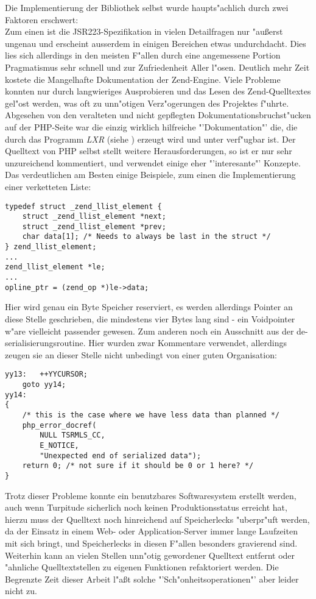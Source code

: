 Die Implementierung der Bibliothek selbst wurde haupts"achlich durch zwei Faktoren erschwert:\\
Zum einen ist die JSR223-Spezifikation in vielen Detailfragen nur "au\ss erst ungenau und erscheint ausserdem
in einigen Bereichen etwas undurchdacht. Dies lies sich allerdings in den meisten F"allen durch eine
angemessene Portion Pragmatismus sehr schnell und zur Zufriedenheit Aller l"osen. Deutlich mehr Zeit
kostete die Mangelhafte Dokumentation der Zend-Engine. Viele Probleme konnten nur durch langwieriges
Ausprobieren und das Lesen des Zend-Quelltextes gel"ost werden, was oft zu unn"otigen Verz"ogerungen 
des Projektes f"uhrte. Abgesehen von den veralteten und nicht gepflegten Dokumentationsbruchst"ucken
auf der PHP-Seite \cite{PHPHP} war die einzig wirklich hilfreiche "'Dokumentation"' die, die durch das Programm
\emph{LXR} (siehe \cite{LXRHP}) erzeugt wird und unter \cite{PHPLXR} verf"ugbar ist. Der Quelltext
von PHP selbst stellt weitere Herausforderungen, so ist er nur sehr unzureichend kommentiert, und verwendet
einige eher "'interesante"' Konzepte. Das verdeutlichen am Besten einige Beispiele, zum einen die 
Implementierung einer verketteten Liste:
\begin{lstlisting}[caption=Verkettete Liste im Zend-Code]
typedef struct _zend_llist_element {
    struct _zend_llist_element *next;
    struct _zend_llist_element *prev;
    char data[1]; /* Needs to always be last in the struct */
} zend_llist_element;
...
zend_llist_element *le;
...
opline_ptr = (zend_op *)le->data;
\end{lstlisting}
Hier wird genau ein Byte Speicher reserviert, es werden allerdings Pointer an diese Stelle geschrieben,
die mindestens vier Bytes lang sind - ein Voidpointer w"are vielleicht passender gewesen.
Zum anderen noch ein Ausschnitt aus der de-serialisierungsroutine. Hier wurden zwar Kommentare
verwendet, allerdings zeugen sie an dieser Stelle nicht unbedingt von einer guten Organisation:
\begin{lstlisting}[caption=lustiges Beispiel f"ur Zend-Code]
yy13:   ++YYCURSOR;
    goto yy14;
yy14:
{
    /* this is the case where we have less data than planned */
    php_error_docref(
        NULL TSRMLS_CC, 
        E_NOTICE, 
        "Unexpected end of serialized data");
    return 0; /* not sure if it should be 0 or 1 here? */
}
\end{lstlisting}

Trotz dieser Probleme konnte ein benutzbares Softwaresystem erstellt werden, auch wenn Turpitude sicherlich
noch keinen Produktionsstatus erreicht hat, hierzu muss der Quelltext noch hinreichend auf Speicherlecks
"uberpr"uft werden, da der Einsatz in einem Web- oder Application-Server immer lange Laufzeiten mit sich bringt,
und Speicherlecks in diesen F"allen besonders gravierend sind. Weiterhin kann an vielen Stellen unn"otig gewordener
Quelltext entfernt oder "ahnliche Quelltextstellen zu eigenen Funktionen refaktoriert werden. Die Begrenzte Zeit
dieser Arbeit l"a\ss t solche "'Sch"onheitsoperationen"' aber leider nicht zu.

